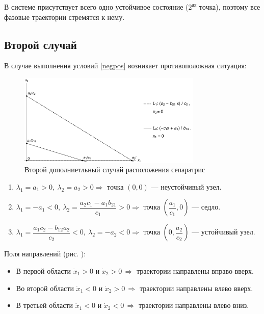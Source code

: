 \documentclass[12pt,a4paper]{article}
\begin{document}
    В системе присутствует всего одно устойчивое состояние ($2^{\text{ая}}$ точка), поэтому все фазовые траектории стремятся к нему.

    \pagebreak

    \subsection{Второй случай}
    В случае выполнения условий \eqref{negpos} возникает противоположная ситуация:
    \begin{figure}[h]
        \centering
        \includegraphics[width=0.78\textwidth]{sep_4.pdf}
        \caption{Второй дополниетльный случай расположения сепаратрис}
        \label{fig:sep_4}
    \end{figure}

    \begin{enumerate}
        \setlength\itemsep{0.5em}
        \item $ \lambda_1 = a_1 > 0,\ \lambda_2 = a_2 > 0 \Rightarrow $ точка $ (0, 0) $ --- неустойчивый узел.
    
        \item $ \lambda_1 = -a_1 < 0,\ \lambda_2 = \dfrac{a_2 c_1 - a_1 b_{21}}{c_1} > 0 \Rightarrow $ точка $ \left( \dfrac{a_1}{c_1}, 0 \right) $ --- седло.
        
        \item  $ \lambda_1 = \dfrac{a_1 c_2 - b_{12} a_2}{c_2} < 0,\ \lambda_2 = -a_2 < 0 \Rightarrow $ точка $ \left( 0, \dfrac{a_2}{c_2} \right) $ --- устойчивый узел.
    \end{enumerate}

    Поля направлений (рис. ): 

    \begin{itemize}
        \setlength\itemsep{0.4em}
        \item В первой области $ \dot x_1 > 0 $ и $ \dot x_2 > 0 \, \Rightarrow $ траектории направлены вправо вверх.
        \item Во второй области $ \dot x_1 < 0 $ и $ \dot x_2 > 0 \, \Rightarrow $ траектории направлены влево вверх.
        \item В третьей области $ \dot x_1 < 0 $ и $ \dot x_2 < 0 \, \Rightarrow $ траектории направлены влево вниз.
    \end{itemize}
\end{document}
